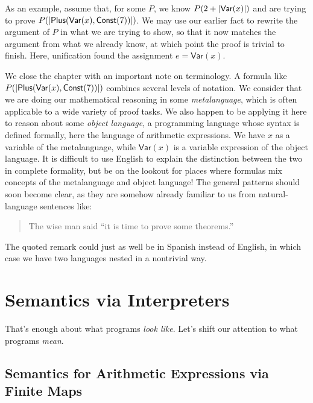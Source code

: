 \documentclass{amsbook}
\theoremstyle{definition}
\theoremstyle{remark}
\numberwithin{section}{chapter}
\numberwithin{equation}{chapter}
\begin{document}
As an example, assume that, for some $P$, we know $P(2 + {\left \lvert \mathsf{Var}(x) \right \rvert})$ and are trying to prove $P({\left \lvert \mathsf{Plus}(\mathsf{Var}(x), \mathsf{Const}(7)) \right \rvert})$.
We may use our earlier fact to rewrite the argument of $P$ in what we are trying to show, so that it now matches the argument from what we already know, at which point the proof is trivial to finish.
Here, unification found the assignment $e = \mathsf{Var}(x)$.

\medskip

\encoding
\label{metalanguage}
We close the chapter with an important note on terminology.
A formula like $P({\left \lvert \mathsf{Plus}(\mathsf{Var}(x), \mathsf{Const}(7)) \right \rvert})$ combines several levels of notation.
We consider that we are doing our mathematical reasoning in some \emph{metalanguage}, which is often applicable to a wide variety of proof tasks.
We also happen to be applying it here to reason about some \emph{object language}, a programming language whose syntax is defined formally, here the language of arithmetic expressions.
We have $x$ as a variable of the metalanguage, while $\mathsf{Var}(x)$ is a variable expression of the object language.
It is difficult to use English to explain the distinction between the two in complete formality, but be on the lookout for places where formulas mix concepts of the metalanguage and object language!
The general patterns should soon become clear, as they are somehow already familiar to us from natural-language sentences like:
\begin{quote}
  The wise man said ``it is time to prove some theorems.''
\end{quote}
The quoted remark could just as well be in Spanish instead of English, in which case we have two languages nested in a nontrivial way.


\chapter{\label{interpreters}Semantics via Interpreters}

That's enough about what programs \emph{look like}.
Let's shift our attention to what programs \emph{mean}.

\section{Semantics for Arithmetic Expressions via Finite Maps}
\end{document}

